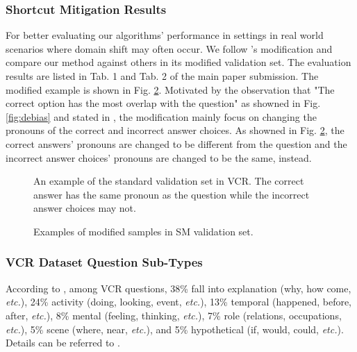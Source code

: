 \documentclass[runningheads]{llncs}
\begin{document}
\subsubsection{Shortcut Mitigation Results}
\label{sec:vcr-sm-valresults}
For better evaluating our algorithms' performance in settings in real world scenarios where domain shift  may often occur. We follow \cite{debias}'s modification and compare our method against others in its modified validation set. The evaluation results are listed in Tab. 1 and Tab. 2 of the main paper submission. The modified example is shown in Fig. \ref{fig:debias2}. Motivated by the observation that "The correct option has the most overlap with the question" as showned in  Fig. \ref{fig:debias} and stated in \cite{debias}, the modification mainly focus on changing the pronouns of the correct and incorrect answer choices. As showned in Fig. \ref{fig:debias2}, the correct answers' pronouns are changed to be different from the question and the incorrect answer choices' pronouns are changed to be the same, instead.


\begin{figure}[th!]
\begin{center}
\scriptsize
{}
\end{center}
\caption{An example of the standard validation set in VCR. The correct answer has the same pronoun as the question while the incorrect answer choices may not.}
\label{fig:debias1}
\end{figure}

\begin{figure}[th!]
\begin{center}
\scriptsize
{}
\end{center}
\caption{Examples of modified samples in SM validation set.}
\label{fig:debias2}
\end{figure}

\subsubsection{VCR Dataset Question Sub-Types}
\label{sec:vcr-subtypes}


According to \cite{zellers2019vcr}, among VCR questions, 38\% fall into explanation (why, how come, \textit{etc.}), 24\% activity (doing, looking, event, \textit{etc.}), 13\% temporal (happened, before, after, \textit{etc.}), 8\% mental (feeling, thinking, \textit{etc.}), 7\% role (relations, occupations, \textit{etc.}), 5\% scene (where, near, \textit{etc.}), and 5\% hypothetical (if, would, could, \textit{etc.}). Details can be referred to \cite{zellers2019vcr}.
\end{document}
